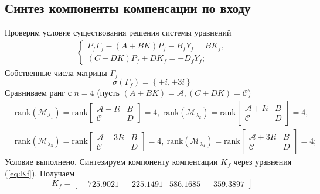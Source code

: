 \documentclass[a4paper, 12pt]{article}
\begin{document}
    \subsection{Синтез компоненты компенсации по входу}
    Проверим условие существования решения системы уравнений
    \begin{align}
        \begin{cases}
            P_f\Gamma_f-\left( A+BK \right)P_f-B_fY_f=BK_f,\\
            \left( C+DK \right)P_f+DK_f=-D_fY_f;
        \end{cases}\label{eq:Kf}
    \end{align}
    Собственные числа матрицы $\Gamma_f$
    $$
    \sigma\left( \Gamma_f \right)=\left\{ \pm i,\pm3i \right\}
    $$
    Сравниваем ранг с $n=4$ (пусть $\left( A+BK \right)=\mathcal{A},\left( C+DK \right)=\mathcal{C}$)
    \begin{align*}
    &\text{rank}\left( \mathcal{M}_{\lambda_1} \right)=\text{rank}\begin{bmatrix}
        \mathcal{A}-Ii &B\\
        \mathcal{C} &D
    \end{bmatrix}=4,\ \text{rank}\left( \mathcal{M}_{\lambda_2} \right)=\text{rank}\begin{bmatrix}
        \mathcal{A}+Ii &B\\
        \mathcal{C} &D
    \end{bmatrix}=4,\\
    &\text{rank}\left( \mathcal{M}_{\lambda_3} \right)=\text{rank}\begin{bmatrix}
        \mathcal{A}-3Ii &B\\
        \mathcal{C} &D
    \end{bmatrix}=4,\ \text{rank}\left( \mathcal{M}_{\lambda_4} \right)=\text{rank}\begin{bmatrix}
        \mathcal{A}+3Ii &B\\
        \mathcal{C} &D
    \end{bmatrix}=4;
    \end{align*}
    Условие выполнено. Синтезируем компоненту компенсации $K_f$ через уравнения (\ref{eq:Kf}).
    Получаем
    $$
    K_f=\begin{bmatrix}
        -725.9021 &-225.1491  &586.1685 &-359.3897
    \end{bmatrix}
    $$
\end{document}
